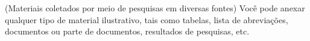 (Materiais coletados por meio de pesquisas em diversas fontes)
Você pode anexar qualquer tipo de material ilustrativo, tais como tabelas, lista de
abreviações, documentos ou parte de documentos, resultados de pesquisas, etc.
